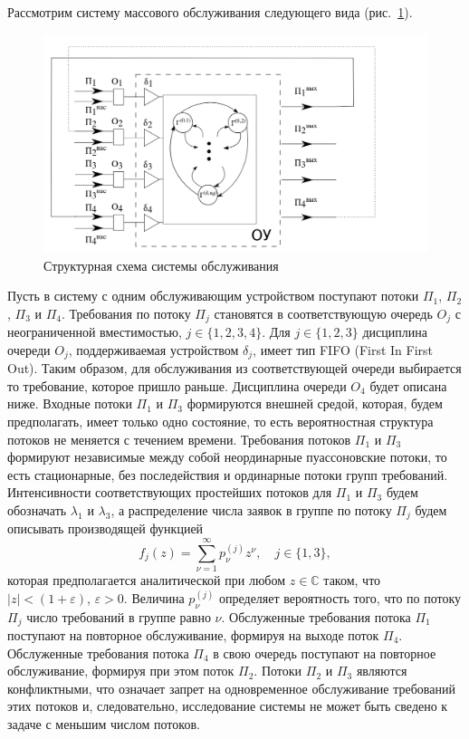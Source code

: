 \documentclass[a4paper,twoside]{article}
\theoremstyle{theorem}
\theoremstyle{remark}
\begin{document}
Рассмотрим систему массового обслуживания следующего вида (рис.~\ref{SystemScheme}).
\begin{figure}[h]
\includegraphics[scale=0.4]{SystemScheme.png} 
\caption{Структурная схема системы обслуживания}
\label{SystemScheme}
\end{figure}
Пусть в систему с одним обслуживающим устройством поступают потоки $\Pi_1$, $\Pi_2$, $\Pi_3$  и $\Pi_4$. Требования по потоку $\Pi_j$ становятся в соответствующую очередь $O_j$ с неограниченной вместимостью, $j\in \{1, 2, 3, 4\}$. Для $j \in \{1, 2, 3\}$ дисциплина очереди $O_j$, поддерживаемая устройством $\delta_j$, имеет тип FIFO (First In First Out). Таким образом, для обслуживания из соответствующей очереди выбирается то требование, которое пришло раньше. Дисциплина очереди $O_4$ будет описана ниже. Входные потоки $\Pi_1$ и $\Pi_3$ формируются внешней средой, которая, будем предполагать, имеет только одно состояние, то есть вероятностная структура потоков не меняется с течением времени. Требования потоков $\Pi_1$ и $\Pi_3$ формируют независимые между собой неординарные пуассоновские потоки, то есть  стационарные, без последействия и ординарные потоки групп требований. Интенсивности соответствующих простейших потоков для $\Pi_1$ и $\Pi_3$ будем обозначать $\lambda_1$ и $\lambda_3$, а распределение числа заявок в группе по потоку $\Pi_j$ будем описывать производящей функцией
\begin{equation}
f_j(z) = \sum_{\nu=1}^{\infty} p_{\nu}^{(j)} z ^{\nu}, \quad j\in \{1,3\},
\label{GeneratingFunc}
\end{equation}
которая предполагается аналитической при любом $z\in \mathbb{C}$ таком, что $|z|<(1+\varepsilon)$, $\varepsilon>0$. Величина $p_{\nu}^{(j)}$ определяет вероятность того, что по потоку $\Pi_j$ число требований в группе равно $\nu$. Обслуженные требования потока $\Pi_1$ поступают на повторное обслуживание, формируя на выходе поток $\Pi_4$. Обслуженные требования потока $\Pi_4$ в свою очередь поступают на повторное обслуживание, формируя при этом поток $\Pi_2$. Потоки $\Pi_2$ и $\Pi_3$ являются конфликтными, что означает запрет на одновременное обслуживание требований этих потоков и, следовательно, исследование системы не может быть сведено к задаче с меньшим числом потоков. 
\end{document}
